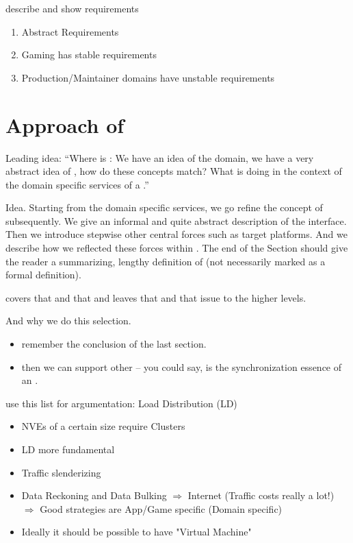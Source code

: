 describe and show requirements

\begin{enumerate}
\item Abstract Requirements
\item Gaming has stable requirements
\item Production/Maintainer domains have unstable requirements
\end{enumerate}

\section{Approach of \SYNEIGHT}
Leading idea: ``Where is \SYNEIGHT: We have an idea of the domain, we
have a very abstract idea of \SYNEIGHT, how do these concepts match?
What is \SYNEIGHT doing in the context of the domain specific services
of a \MMORG.''

Idea. Starting from the domain specific services, we go refine the
concept of \SYNEIGHT subsequently. We give an informal and quite
abstract description of the interface. Then we introduce stepwise
other central forces such as target platforms. And we describe how we
reflected these forces within \SYNEIGHT. The end of the Section should
give the reader a summarizing, lengthy definition of \SYNEIGHT (not
necessarily marked as a formal definition).


\SYNEIGHT covers that and that and leaves that and that issue to the
higher levels.

And why we do this selection. 
\begin{itemize}
\item remember the conclusion of the last section.
\item then we can support other \NVES -- you could say, \SYNEIGHT is
the synchronization essence of an \NVE.
\end{itemize}


use this list for argumentation: Load Distribution (LD)
\begin{itemize}
        \item NVEs of a certain size require Clusters
        \item LD more fundamental
        \item Traffic slenderizing
        \item Data Reckoning and Data Bulking
              $\Rightarrow$ Internet (Traffic costs
              really a lot!)\\
              $\Rightarrow$ Good strategies are App/Game
              specific (Domain specific)
	\item Ideally it should be possible to have "Virtual Machine"
\end{itemize}

